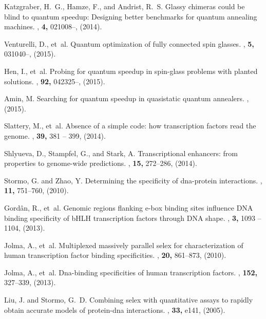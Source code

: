 \documentclass[aps,pra,groupedaddress,nofootinbib,notitlepage,showpacs,floatfix,superscriptaddress]{revtex4-1}
\begin{document}
\begin{thebibliography}{10}
Katzgraber, H.~G., Hamze, F., and Andrist, R.~S.
\newblock Glassy chimeras could be blind to quantum speedup: Designing better
  benchmarks for quantum annealing machines.
, {\bf 4,} 021008--, (2014).

Venturelli, D., et~al.
\newblock Quantum optimization of fully connected spin glasses.
, {\bf 5,} 031040--, (2015).

Hen, I., et~al.
\newblock Probing for quantum speedup in spin-glass problems with planted
  solutions.
, {\bf 92,} 042325--, (2015).

Amin, M.
\newblock Searching for quantum speedup in quasistatic quantum annealers.
, (2015).

Slattery, M., et~al.
\newblock Absence of a simple code: how transcription factors read the genome.
, {\bf 39,} 381 -- 399, (2014).

Shlyueva, D., Stampfel, G., and Stark, A.
\newblock Transcriptional enhancers: from properties to genome-wide
  predictions.
, {\bf 15,} 272--286, (2014).

Stormo, G. and Zhao, Y.
\newblock Determining the specificity of dna-protein interactions.
, {\bf 11,} 751--760, (2010).

Gord{\^a}n, R., et~al.
\newblock Genomic regions flanking e-box binding sites influence {DNA} binding
  specificity of {bHLH} transcription factors through {DNA} shape.
, {\bf 3,} 1093 -- 1104, (2013).

Jolma, A., et~al.
\newblock Multiplexed massively parallel selex for characterization of human
  transcription factor binding specificities.
, {\bf 20,} 861--873, (2010).

Jolma, A., et~al.
\newblock Dna-binding specificities of human transcription factors.
, {\bf 152,} 327--339, (2013).

Liu, J. and Stormo, G.~D.
\newblock Combining selex with quantitative assays to rapidly obtain accurate
  models of protein-dna interactions.
, {\bf 33,} e141, (2005).


\end{thebibliography}
\end{document}
